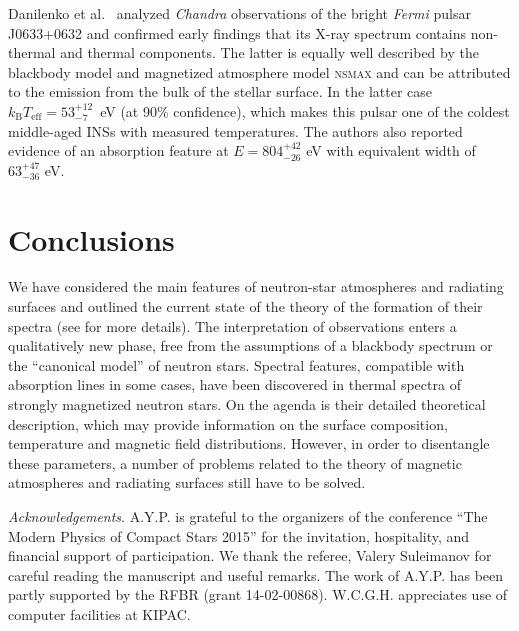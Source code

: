\documentclass{pos1}
\newcommand{\kB}{k_\mathrm{B}}
\newcommand{\Teff}{T_\mathrm{eff}}
\begin{document}
Danilenko et al.~\cite{Danilenko_ea15} analyzed \textit{Chandra}
observations of the bright \textit{Fermi} pulsar J0633+0632 and confirmed early
findings that its X-ray spectrum contains non-thermal and thermal
components. The latter is equally well described by the blackbody
model and magnetized atmosphere model \textsc{nsmax} and can be
attributed to the emission from the bulk of the stellar surface. In
the latter case $\kB\Teff=53^{+12}_{-7}$~eV (at 90\% confidence),
which makes this pulsar  one of the coldest middle-aged INSs with
measured temperatures. The authors also reported evidence of an
absorption feature at $E=804^{+42}_{-26}$ eV with equivalent width of
$63^{+47}_{-36}$ eV.

\section{Conclusions}
\label{sec:concl}

We have considered the main features of neutron-star atmospheres and
radiating surfaces and outlined the current state of the theory of the
formation of their spectra
(see \cite{P14} for more details).
The interpretation of observations enters
a qualitatively new phase, free from the assumptions of a blackbody
spectrum or the ``canonical model'' of neutron stars. Spectral
features, compatible with absorption lines in some cases, have been
discovered in thermal spectra of strongly magnetized neutron stars. On
the agenda is their detailed theoretical description, which may
provide information on the surface composition, temperature and
magnetic field distributions. However, in order to disentangle these
parameters, a number of  problems related to the theory of magnetic
atmospheres and radiating surfaces  still have to be solved.

\emph{Acknowledgements}.
A.Y.P.{} is grateful to the organizers of the conference  ``The Modern
Physics of Compact Stars 2015'' for the invitation, hospitality, and
financial support of participation.  We thank the referee, Valery
Suleimanov for careful reading the manuscript and useful remarks. The
work of A.Y.P.{} has been partly  supported  by the RFBR  (grant
14-02-00868). W.C.G.H. appreciates use of computer facilities at
KIPAC.
\end{document}
